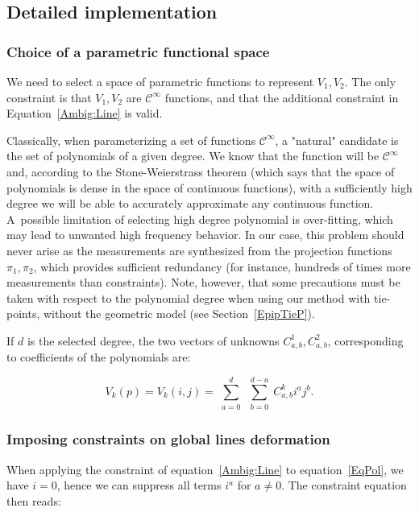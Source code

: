 \documentclass{ipol}
\begin{document}
\subsection{Detailed implementation}


\subsubsection{Choice of a parametric functional space}
\label{ChoicePolyn}

We need to select a space of parametric functions to represent $V_1,V_2$. The only constraint
is that $V_1,V_2$ are $\mathcal{C}^{\infty}$ functions, and that the additional constraint in 
Equation~\eqref{Ambig:Line} is valid. 

Classically, when parameterizing a set of functions  $\mathcal{C}^{\infty}$,
a "natural" candidate is the set of polynomials of a given degree. We know that the function will be
$\mathcal{C}^{\infty}$ and, according to the Stone-Weierstrass theorem \cite{Weierstrass1885,Stone1937} (which says that the space of polynomials is dense in the space of continuous functions),  with a sufficiently high
degree we will be able to accurately approximate any continuous function. A~possible
limitation of selecting high degree polynomial is over-fitting, which may lead to
unwanted high frequency behavior. In our case, this problem should never arise as the measurements  are synthesized from the projection functions $\pi_1,\pi_2$, which provides sufficient redundancy (for instance,
 hundreds of times more measurements than constraints). {Note, however, that some precautions must be taken with respect to the polynomial degree when using our method with tie-points, without the geometric model (see Section~\ref{EpipTieP})}.

If $d$ is the selected degree, the two vectors of unknowns $C^1_{a,b},C^2_{a,b}$, 
corresponding to coefficients of the polynomials are:


\begin{equation}
   V_k(p) = V_k(i,j) =  \sum\limits_{\substack{a=0}}^d  \sum\limits_{\substack{b=0}}^{d-a}  C^k_{a,b}  i^a j^b. \label{EqPol}
\end{equation}
   
\subsubsection{Imposing constraints on global lines deformation}

{When applying the constraint of equation~\eqref{Ambig:Line} to equation~\eqref{EqPol}, 
we have $i=0$, hence we can suppress all terms  $i^a$ for $a\neq 0$}. The constraint equation then reads:
\end{document}

